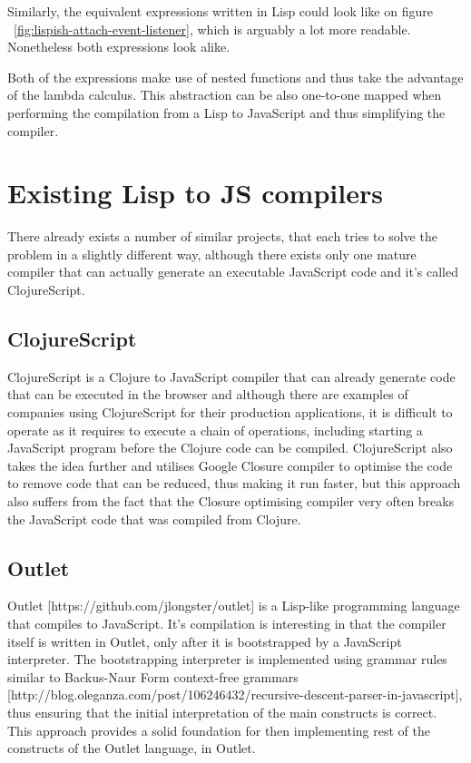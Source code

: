 

Similarly, the equivalent expressions written in Lisp could look like on figure ~\ref{fig:lispish-attach-event-listener}, which is arguably a lot more readable. Nonetheless both expressions look alike. 

Both of the expressions make use of nested functions and thus take the advantage of the lambda calculus. This abstraction can be also one-to-one mapped when performing the compilation from a Lisp to JavaScript and thus simplifying the compiler.

\section{Existing Lisp to JS compilers}
There already exists a number of similar projects, that each tries to solve the problem in a slightly different way, although there exists only one mature compiler that can actually generate an executable JavaScript code and it's called ClojureScript.

\subsection{ClojureScript}
ClojureScript is a Clojure to JavaScript compiler that can already generate code that can be executed in the browser and although there are examples of companies using ClojureScript for their production applications, it is difficult to operate as it requires to execute a chain of operations, including starting a JavaScript program before the Clojure code can be compiled.
ClojureScript also takes the idea further and utilises Google Closure compiler to optimise the code to remove code that can be reduced, thus making it run faster, but this approach also suffers from the fact that the Closure optimising compiler very often breaks the JavaScript code that was compiled from Clojure.

\subsection{Outlet}
Outlet [https://github.com/jlongster/outlet] is a Lisp-like programming language that compiles to JavaScript. 
It's compilation is interesting in that the compiler itself is written in Outlet, only after it is bootstrapped by a JavaScript interpreter.
The bootstrapping interpreter is implemented using grammar rules similar to Backus-Naur Form context-free grammars [http://blog.oleganza.com/post/106246432/recursive-descent-parser-in-javascript], thus ensuring that the initial interpretation of the main constructs is correct. 
This approach provides a solid foundation for then implementing rest of the constructs of the Outlet language, in Outlet.

